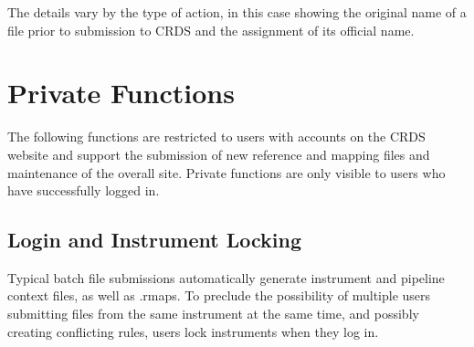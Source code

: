 \documentclass[letterpaper,10pt,english]{sphinxmanual}
\begin{document}
The details vary by the type of action,  in this case showing the original name
of a file prior to submission to CRDS and the assignment of its official name.


\section{Private Functions}
\label{web_site_use:private-functions}
The following functions are restricted to users with accounts on the CRDS website
and support the submission of new reference and mapping files and maintenance
of the overall site.   Private functions are only visible to users who have
successfully logged in.


\subsection{Login and Instrument Locking}
\label{web_site_use:login-and-instrument-locking}
Typical batch file submissions automatically generate instrument and pipeline context
files,  as well as .rmaps.   To preclude the possibility of multiple users submitting
files from the same instrument at the same time,  and possibly creating conflicting
rules,  users lock instruments when they log in.
\begin{figure}[htbp]
\centering

\end{figure}
\end{document}
